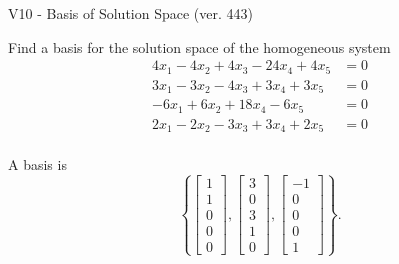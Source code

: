 \begin{exercise}
  \begin{exerciseTitle}V10 - Basis of Solution Space (ver. 443)\end{exerciseTitle}
  \begin{exerciseStatement}
    Find a basis for the solution space of the homogeneous system 
\begin{align*}
 4 x_ 1 -4 x_ 2 + 4 x_ 3 -24 x_ 4 + 4 x_ 5 &= 0  \\ 
  3 x_ 1 -3 x_ 2 -4 x_ 3 + 3 x_ 4 + 3 x_ 5 &= 0  \\ 
  -6 x_ 1 + 6 x_ 2 + 18 x_ 4 -6 x_ 5 &= 0  \\ 
  2 x_ 1 -2 x_ 2 -3 x_ 3 + 3 x_ 4 + 2 x_ 5 &= 0  \\ 
 \end{align*}


 
  \end{exerciseStatement}

  \begin{exerciseAnswer}
   A basis is   
\[\left\{\left[\begin{array}{c}
1 \\
1 \\
0 \\
0 \\
0
\end{array}\right] , \left[\begin{array}{c}
3 \\
0 \\
3 \\
1 \\
0
\end{array}\right] , \left[\begin{array}{c}
-1 \\
0 \\
0 \\
0 \\
1
\end{array}\right]\right\}.\]

  


  \end{exerciseAnswer}
\end{exercise}